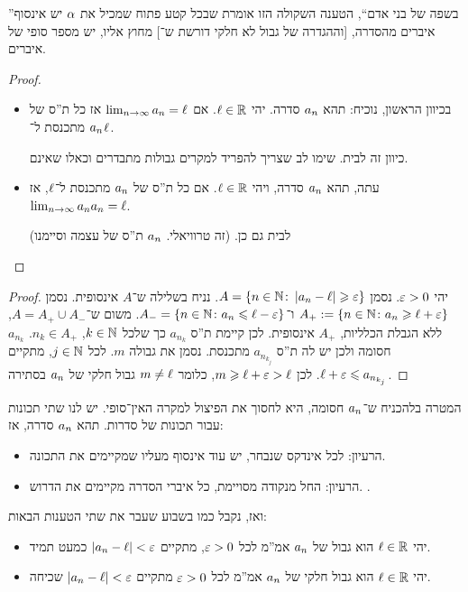 \documentclass[name=רשימות חשבון דיפרנציאלי ואינטגרלי 1א]{../../../tex/classes/megasumPreamble}
\begin{document}
	''בשפה של בני אדם``, הטענה השקולה הזו אומרת שבכל קטע פתוח שמכיל את $\alpha$ יש אינסוף איברים מהסדרה, [וההגדרה של גבול לא חלקי דורשת ש־] מחוץ אליו, יש מספר סופי של איברים.


	\begin{proof}
		\begin{itemize}
			\item[$\impliedby$] בכיוון הראשון, נוכיח: תהא $a_n$ סדרה. יהי $\ell \in \mathbb{R}$. אם $\lim_{n \to \infty} a_n = \ell$ אז כל ת''ס של $a_n$ מתכנסת ל־$\ell$.

			כיוון זה לבית. שימו לב שצריך להפריד למקרים גבולות מתבדרים וכאלו שאינם.

			\item[$\implies$] עתה, תהא $a_n$ סדרה, ויהי $\ell \in \mathbb{R}$. אם כל ת''ס של $a_n$ מתכנסת ל־$\ell$, אז $\lim_{n \to \infty} a_n a_n = \ell$.

			לבית גם כן. (זה טרוויאלי. $a_n$ ת''ס של עצמה וסיימנו)
		\end{itemize}
	\end{proof}

	\begin{proof}
		יהי $\eg > 0$. נסמן $A = \{n \in \N \co \sof{a_n - \ml} \ge \eg\}$. נניח בשלילה ש־$A$ אינסופית. נסמן $A_{+} := \{n \in \N\co a_n \ge \ml + \eg\}$ ו־$A_- = \{ n \in \N \co a_n \le \ml - \eg\}$. משום ש־$A = A_+ \cup A_-$, ללא הגבלת הכלליות, $A_+$ אינסופית. לכן קיימת ת''ס $a_{n_k}$ כך שלכל $k \in \mathbb{N}$, $n_{k} \in A_+$. $a_{n_k}$ חסומה ולכן יש לה ת''ס $a_{n_{k_j}}$ מתכנסת. נסמן את גבולה $m$. לכל $j \in \mathbb{N}$, מתקיים $\ml + \eg \le a_{n_{k_j}}$. לכן $m \ge \ml + \eg> \ml$, כלומר $m \neq \ell$ גבול חלקי של $a_n$ בסתירה.
	\end{proof}
	המטרה בלהכניח ש־$a_n$ חסומה, היא לחסוך את הפיצול למקרה האין־סופי.
		יש לנו שתי תכונות עבור תכונות של סדרות. תהא $a_n$ סדרה, אז:
	\begin{itemize}
		\item הרעיון: לכל אינדקס שנבחר, יש עוד אינסוף מעליו שמקיימים את התכונה.
		\item הרעיון: החל מנקודה מסויימת, כל איברי הסדרה מקיימים את הדרוש.
		. \envendproof
	\end{itemize}
	ואז, נקבל כמו בשבוע שעבר את שתי הטענות הבאות:
	\begin{itemize}
		\item יהי $\ell \in \mathbb{R}$ הוא גבול של $a_n$ אמ''מ לכל $\eg > 0$, מתקיים $\sof{a_n - \ml} < \eg$ כמעט תמיד.
		\item יהי $\ell \in \mathbb{R}$ הוא גבול חלקי של $a_n$ אמ''מ לכל $\eg > 0$ מתקיים $\sof{a_n - \ml} < \eg$ שכיחה.
	\end{itemize}
\end{document}
